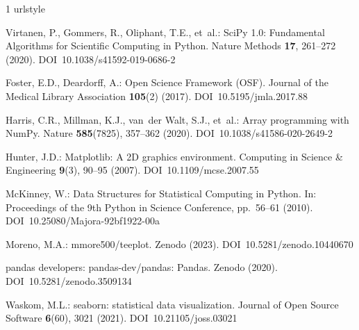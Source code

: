 \begin{thebibliography}{1}
\providecommand{\url}[1]{{#1}}
\providecommand{\urlprefix}{URL }
\expandafter\ifx\csname urlstyle\endcsname\relax
  \providecommand{\doi}[1]{DOI~\discretionary{}{}{}#1}\else
  \providecommand{\doi}{DOI~\discretionary{}{}{}\begingroup
  \urlstyle{rm}\Url}\fi

Virtanen, P., Gommers, R., Oliphant, T.E., et~al.: {SciPy} 1.0: Fundamental
  Algorithms for Scientific Computing in Python.
\newblock Nature Methods \textbf{17}, 261--272 (2020).
\newblock \doi{10.1038/s41592-019-0686-2}

Foster, E.D., Deardorff, A.: Open Science Framework (OSF).
\newblock Journal of the Medical Library Association \textbf{105}(2) (2017).
\newblock \doi{10.5195/jmla.2017.88}

Harris, C.R., Millman, K.J., van~der Walt, S.J., et~al.: Array programming with
  {NumPy}.
\newblock Nature \textbf{585}(7825), 357--362 (2020).
\newblock \doi{10.1038/s41586-020-2649-2}

Hunter, J.D.: Matplotlib: A 2D graphics environment.
\newblock Computing in Science \& Engineering \textbf{9}(3), 90--95 (2007).
\newblock \doi{10.1109/mcse.2007.55}

McKinney, W.: Data Structures for Statistical Computing in Python.
\newblock In: Proceedings of the 9th Python in Science Conference, pp.~56--61
  (2010).
\newblock \doi{10.25080/Majora-92bf1922-00a}

Moreno, M.A.: mmore500/teeplot.
\newblock Zenodo (2023).
\newblock \doi{10.5281/zenodo.10440670}

pandas developers: pandas-dev/pandas: Pandas.
\newblock Zenodo (2020).
\newblock \doi{10.5281/zenodo.3509134}

Waskom, M.L.: seaborn: statistical data visualization.
\newblock Journal of Open Source Software \textbf{6}(60), 3021 (2021).
\newblock \doi{10.21105/joss.03021}

\end{thebibliography}
